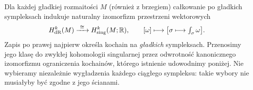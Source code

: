 \begin{twierdzenie}[de Rham]
\label{thm:de-rham}
Dla każdej gładkiej rozmaitości $M$ (również z brzegiem)
całkowanie po gładkich sympleksach indukuje naturalny
izomorfizm przestrzeni wektorowych
\begin{equation}\label{eq:de-rham-iso}
 H^k_{\mathrm{dR}}(M)\xrightarrow{\ \cong\ }
 H^k_{\mathrm{sing}}(M;\mathbb{R}),
 \qquad [\omega]\longmapsto
 \bigl[\sigma\longmapsto\textstyle\int_\sigma\omega\bigr].
\end{equation}
Zapis po prawej najpierw określa kochain na
\emph{gładkich} sympleksach. Przenosimy jego klasę do
zwykłej kohomologii singularnej przez odwrotność
kanonicznego izomorfizmu ograniczenia kochainów,
którego istnienie udowodnimy poniżej. Nie wybieramy
niezależnie wygładzenia każdego ciągłego sympleksu:
takie wybory nie musiałyby być zgodne z jego ścianami.
\end{twierdzenie}
